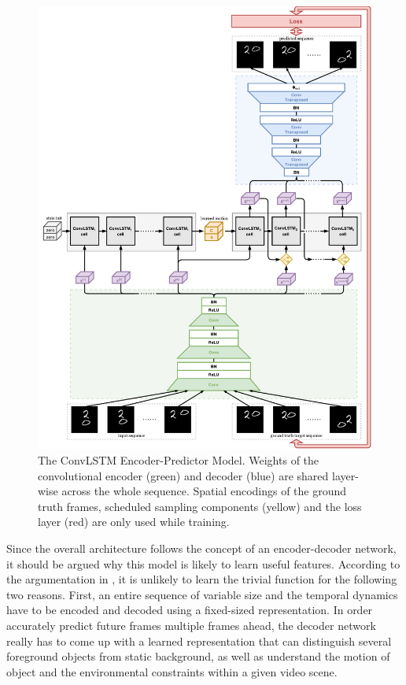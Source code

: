 \begin{figure}[p]
	\centering
	\includegraphics[width=0.96\linewidth]{figures/total_model.pdf}
	\caption[ConvLSTM Encoder-Predictor Model]{The ConvLSTM Encoder-Predictor Model. Weights of the convolutional encoder (green) and decoder (blue) are shared layer-wise across the whole sequence. Spatial encodings of the ground truth frames, scheduled sampling components (yellow) and the loss layer (red) are only used while training.} \label{fig:total_model}
\end{figure}

Since the overall architecture follows the concept of an encoder-decoder network, it should be argued why this model is likely to learn useful features. According to the argumentation in \parencite[p. 3f.]{unsup_learn_lstm}, it is unlikely to learn the trivial function for the following two reasons. First, an entire sequence of variable size and the temporal dynamics have to be encoded and decoded using a fixed-sized representation. In order accurately predict future frames multiple frames ahead, the decoder network really has to come up with a learned representation that can distinguish several foreground objects from static background, as well as understand the motion of object and the environmental constraints within a given video scene.
